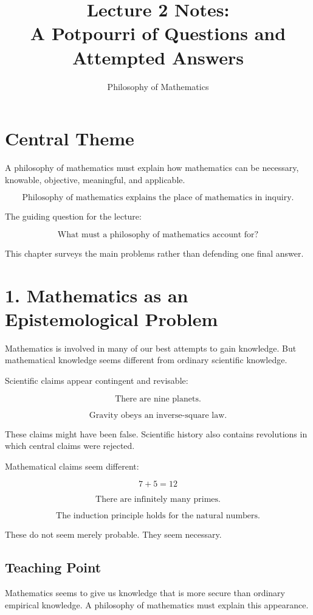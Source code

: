 \documentclass[11pt]{article}
\title{Lecture 2 Notes: \\ A Potpourri of Questions and Attempted Answers}
\author{Philosophy of Mathematics}
\date{}
\begin{document}
\maketitle

\section*{Central Theme}

A philosophy of mathematics must explain how mathematics can be necessary,
knowable, objective, meaningful, and applicable.

\[
\boxed{
\text{Philosophy of mathematics explains the place of mathematics in inquiry.}
}
\]

The guiding question for the lecture:

\[
\boxed{
\text{What must a philosophy of mathematics account for?}
}
\]

This chapter surveys the main problems rather than defending one final answer.

\section*{1. Mathematics as an Epistemological Problem}

Mathematics is involved in many of our best attempts to gain knowledge. But mathematical
knowledge seems different from ordinary scientific knowledge.

Scientific claims appear contingent and revisable:

\[
\text{There are nine planets.}
\]

\[
\text{Gravity obeys an inverse-square law.}
\]

These claims might have been false. Scientific history also contains revolutions in which
central claims were rejected.

Mathematical claims seem different:

\[
7+5=12
\]

\[
\text{There are infinitely many primes.}
\]

\[
\text{The induction principle holds for the natural numbers.}
\]

These do not seem merely probable. They seem necessary.

\subsection*{Teaching Point}

Mathematics seems to give us knowledge that is more secure than ordinary empirical
knowledge. A philosophy of mathematics must explain this appearance.
\end{document}
